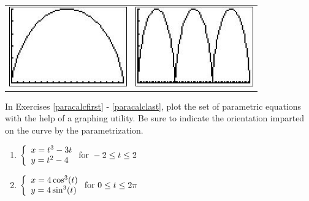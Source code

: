 \documentclass{ximera}
\begin{document}
\begin{center}

\begin{tabular}{cc}

\includegraphics[width=2in]{./ParametricEquationsGraphics/Parametric05.jpg} &
\hspace{0.75in} \includegraphics[width=2in]{./ParametricEquationsGraphics/Parametric06.jpg} \\


\end{tabular} 
\end{center}


In Exercises \ref{paracalcfirst} - \ref{paracalclast}, plot the set of parametric equations with the help of a graphing utility.  Be sure to indicate the orientation imparted on the curve by the parametrization.  

\begin{multicols}{2} \raggedcolumns 
\begin{enumerate}
\setcounter{enumi}{\value{HW}}


\item ${\displaystyle \left\{ \begin{array}{l} x = t^{3} - 3t \\ y = t^{2} - 4 \end{array} \right. \vspace{.25in} \mbox{for } -2 \leq t \leq 2}$ \label{paracalcfirst}
\item ${\displaystyle \left\{ \begin{array}{l} x = 4\cos^{3}(t) \\ y = 4\sin^{3}(t) \end{array} \right. \vspace{.25in} \mbox{for } 0 \leq t \leq 2\pi}$

\setcounter{HW}{\value{enumi}}
\end{enumerate}
\end{multicols}
\end{document}
